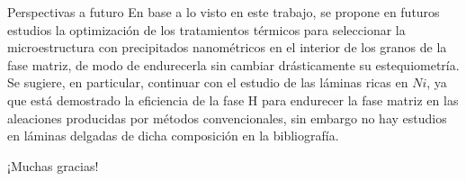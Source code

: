 \documentclass[11pt]{beamer}
\begin{document}
	\begin{frame}{Perspectivas a futuro}
En base a lo visto en este trabajo, se propone en futuros estudios la optimización de los tratamientos térmicos para seleccionar la microestructura con precipitados nanométricos en el interior de los granos de la fase matriz, de modo de endurecerla sin cambiar drásticamente su estequiometría. Se sugiere, en particular, continuar con el estudio de las láminas ricas en $Ni$, ya que está demostrado la eficiencia de la fase H para endurecer la fase matriz en las aleaciones producidas por métodos convencionales, sin embargo no hay estudios en láminas delgadas de dicha composición en la bibliografía.	
\end{frame}
\begin{frame}
	¡Muchas gracias!
\end{frame}
\end{document}
